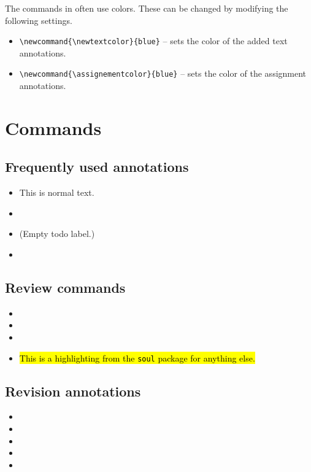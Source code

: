 \documentclass{article}
\begin{document}
The commands in  often use colors. These can be changed by modifying the following settings.
\begin{itemize}
    \item \verb|\newcommand{\newtextcolor}{blue}| -- sets the color of the added text annotations.
    \item \verb|\newcommand{\assignementcolor}{blue}| -- sets the color of the assignment annotations.
\end{itemize}





\section{Commands}\label{sec:commands}

\subsection{Frequently used annotations}

\begin{itemize}
    \item This is normal text.
    \item {}
    \item \todo{} (Empty todo label.)
    \item {}
\end{itemize}

\subsection{Review commands}

\begin{itemize}
    \item {}
    \item {}
    \item {}
    \item \hl{This is a highlighting from the \texttt{soul} package for anything else.}
\end{itemize}

\subsection{Revision annotations}

\begin{itemize}
    \item {}
    \item {}
    \item {}
    \item {}
    \item {}
    
\end{itemize}
\end{document}
